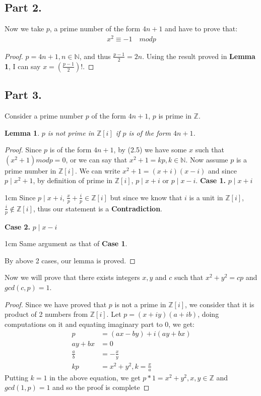 \documentclass{article}
\newtheorem{lemma}{Lemma}
\newenvironment{myenv}{\begin{adjustwidth}{1cm}{}}{\end{adjustwidth}}
\begin{document}
{  \subsection{Part 2.}{
    Now we take $p$, a prime number of the form $4n+1$ and have to prove that:
    \begin{align}
      x^2 \equiv -1 \quad mod p \label{eq:5}
    \end{align}
    \begin{proof}
      $p=4n+1,n \in \mathbb{N}$, and thus $\frac{p-1}{2}=2n$. \newline
      Using the result proved in \textbf{Lemma 1}, I can say $x=(\frac{p-1}{2})!$.
    \end{proof}
  }
  \subsection{Part 3.}{
    Consider a prime number $p$ of the form $4n+1$, $p$ is prime in $\mathbb{Z}$.
    \begin{lemma}
      $p$ is not prime in $\mathbb{Z}[i]$ if $p$ is of the form $4n+1$.
    \end{lemma}
    \begin{proof}
    Since $p$ is of the form $4n+1$, by (2.5) we have some $x$ such that $(x^2+1)modp=0$, or we can say that $x^2+1=kp,k \in \mathbb{N}$. \newline
    Now assume $p$ is a prime number in $\mathbb{Z}[i]$. \newline
    We can write $x^2+1=(x+i)(x-i)$ and since $p \mid x^2+1$, by definition of prime in $\mathbb{Z}[i]$, $p \mid x+i$ or $p \mid x-i$. \newline
    \textbf{Case 1.} $p \mid x+i$
    \begin{myenv}
      Since $p \mid x+i$, $\frac{x}{p}+\frac{i}{p} \in \mathbb{Z}[i]$ but since we know that $i$ is a unit in $\mathbb{Z}[i]$, $\frac{i}{p} \notin \mathbb{Z}[i]$, thus our statement is a \textbf{Contradiction}.
    \end{myenv}
    \textbf{Case 2.} $p \mid x-i$
    \begin{myenv}
      Same argument as that of \textbf{Case 1}.
    \end{myenv}
    By above 2 cases, our lemma is proved.
    \end{proof}
    Now we will prove that there exists integers $x,y$ and $c$ such that $x^2+y^2=cp$ and $gcd(c,p)=1$.
    \begin{proof}
      Since we have proved that $p$ is not a prime in $\mathbb{Z}[i]$, we consider that it is product of 2 numbers from $\mathbb{Z}[i]$. \newline
      Let $p=(x+iy)(a+ib)$, doing computations on it and equating imaginary part to $0$, we get:
      \begin{align}
        p&=(ax-by)+i(ay+bx) \label{eq:6} \\
        ay+bx&=0 \\
        \frac{a}{b}&=-\frac{x}{y} \\
        kp&=x^2+y^2, k=\frac{x}{a}
      \end{align}
      Putting $k=1$ in the above equation, we get $p*1=x^2+y^2, x,y \in \mathbb{Z}$ and $gcd(1,p)=1$ and so the proof is complete
    \end{proof}
  }
}
\end{document}

